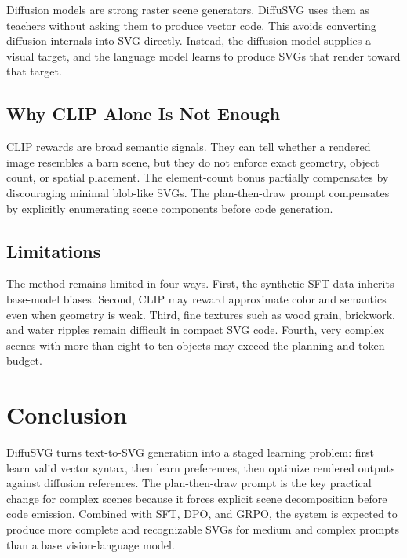 \documentclass[10pt,twocolumn]{article}
\begin{document}
Diffusion models are strong raster scene generators. DiffuSVG uses them as
teachers without asking them to produce vector code. This avoids converting
diffusion internals into SVG directly. Instead, the diffusion model supplies a
visual target, and the language model learns to produce SVGs that render toward
that target.

\subsection{Why CLIP Alone Is Not Enough}

CLIP rewards are broad semantic signals. They can tell whether a rendered image
resembles a barn scene, but they do not enforce exact geometry, object count, or
spatial placement. The element-count bonus partially compensates by discouraging
minimal blob-like SVGs. The plan-then-draw prompt compensates by explicitly
enumerating scene components before code generation.

\subsection{Limitations}

The method remains limited in four ways. First, the synthetic SFT data inherits
base-model biases. Second, CLIP may reward approximate color and semantics even
when geometry is weak. Third, fine textures such as wood grain, brickwork, and
water ripples remain difficult in compact SVG code. Fourth, very complex scenes
with more than eight to ten objects may exceed the planning and token budget.

\section{Conclusion}

DiffuSVG turns text-to-SVG generation into a staged learning problem: first
learn valid vector syntax, then learn preferences, then optimize rendered
outputs against diffusion references. The plan-then-draw prompt is the key
practical change for complex scenes because it forces explicit scene
decomposition before code emission. Combined with SFT, DPO, and GRPO, the system
is expected to produce more complete and recognizable SVGs for medium and
complex prompts than a base vision-language model.
\end{document}
